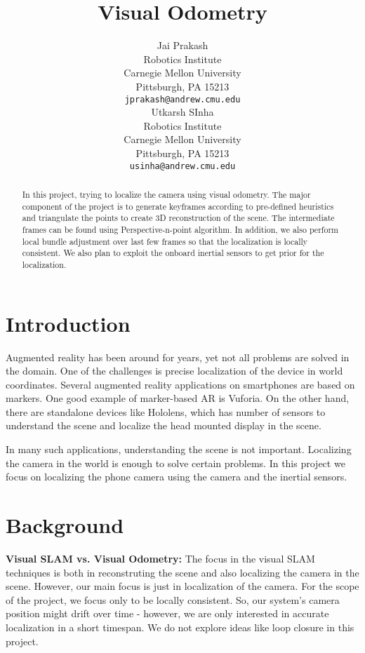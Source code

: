 \documentclass{article}
\title{Visual Odometry}
\author{
  Jai Prakash\\
  Robotics Institute\\
  Carnegie Mellon University\\
  Pittsburgh, PA 15213\\
  \texttt{jprakash@andrew.cmu.edu} \\
 	\And
 Utkarsh SInha \\
  Robotics Institute\\
 Carnegie Mellon University \\
 Pittsburgh, PA 15213\\
  \texttt{usinha@andrew.cmu.edu} \\
}
\begin{document}

\maketitle

\begin{abstract}
In this project, trying to localize the camera using visual odometry. The major component of the project is to generate keyframes according to pre-defined heuristics and triangulate the points to create 3D reconstruction of the scene. The intermediate frames can be found using Perspective-n-point algorithm. In addition, we also perform local bundle adjustment over last few frames so that the localization is locally consistent. We also plan to exploit the onboard inertial sensors to get prior for the localization.
\end{abstract}

\section{Introduction}

Augmented reality has been around for years, yet not all problems are solved in the domain. One of the challenges is precise localization of the device in world coordinates. Several augmented reality applications on smartphones are based on markers. One good example of marker-based AR is Vuforia. On the other hand, there are standalone devices like Hololens, which has number of sensors to understand the scene and localize the head mounted display in the scene.

In many such applications, understanding the scene is not important. Localizing the camera in the world is enough to solve certain problems. In this project we focus on localizing the phone camera using the camera and the inertial sensors.


\section{Background}
\textbf{Visual SLAM vs. Visual Odometry: } The focus in the visual SLAM techniques is both in reconstruting the scene and also localizing the camera in the scene. However, our main focus is just in localization of the camera. For the scope of the project, we focus only to be locally consistent. So, our system's camera position might drift over time - however, we are only interested in accurate localization in a short timespan. We do not explore ideas like loop closure in this project.
\end{document}
